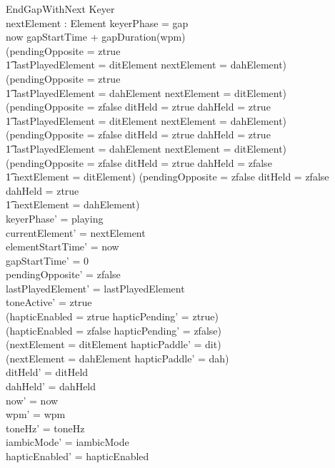 \documentclass[a4paper,10pt,fleqn]{article}
\begin{document}
\begin{schema}{EndGapWithNext}
\Delta Keyer \\
nextElement : Element
\where
keyerPhase = gap \\
now \geq gapStartTime + gapDuration(wpm) \\
(pendingOpposite = ztrue \land \\
\t1 lastPlayedElement = ditElement \land nextElement = dahElement) \lor
(pendingOpposite = ztrue \land \\
\t1 lastPlayedElement = dahElement \land nextElement = ditElement) \lor
(pendingOpposite = zfalse \land ditHeld = ztrue \land dahHeld = ztrue \land \\
\t1 lastPlayedElement = ditElement \land nextElement = dahElement) \lor
(pendingOpposite = zfalse \land ditHeld = ztrue \land dahHeld = ztrue \land \\
\t1 lastPlayedElement = dahElement \land nextElement = ditElement) \lor
(pendingOpposite = zfalse \land ditHeld = ztrue \land dahHeld = zfalse \land \\
\t1 nextElement = ditElement) \lor
(pendingOpposite = zfalse \land ditHeld = zfalse \land dahHeld = ztrue \land \\
\t1 nextElement = dahElement) \\
keyerPhase' = playing \\
currentElement' = nextElement \\
elementStartTime' = now \\
gapStartTime' = 0 \\
pendingOpposite' = zfalse \\
lastPlayedElement' = lastPlayedElement \\
toneActive' = ztrue \\
(hapticEnabled = ztrue \implies hapticPending' = ztrue) \\
(hapticEnabled = zfalse \implies hapticPending' = zfalse) \\
(nextElement = ditElement \implies hapticPaddle' = dit) \\
(nextElement = dahElement \implies hapticPaddle' = dah) \\
ditHeld' = ditHeld \\
dahHeld' = dahHeld \\
now' = now \\
wpm' = wpm \\
toneHz' = toneHz \\
iambicMode' = iambicMode \\
hapticEnabled' = hapticEnabled
\end{schema}
\end{document}
